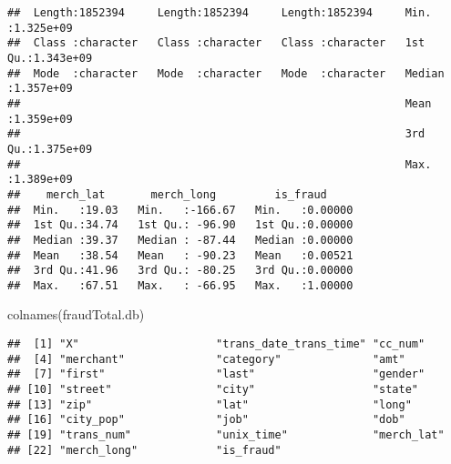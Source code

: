 \documentclass[
]{article}
\newenvironment{Shaded}{\begin{snugshade}}{\end{snugshade}}
\newcommand{\FunctionTok}[1]{\textcolor[rgb]{0.00,0.00,0.00}{#1}}
\newcommand{\NormalTok}[1]{#1}
\begin{document}
\begin{verbatim}
##  Length:1852394     Length:1852394     Length:1852394     Min.   :1.325e+09  
##  Class :character   Class :character   Class :character   1st Qu.:1.343e+09  
##  Mode  :character   Mode  :character   Mode  :character   Median :1.357e+09  
##                                                           Mean   :1.359e+09  
##                                                           3rd Qu.:1.375e+09  
##                                                           Max.   :1.389e+09  
##    merch_lat       merch_long         is_fraud      
##  Min.   :19.03   Min.   :-166.67   Min.   :0.00000  
##  1st Qu.:34.74   1st Qu.: -96.90   1st Qu.:0.00000  
##  Median :39.37   Median : -87.44   Median :0.00000  
##  Mean   :38.54   Mean   : -90.23   Mean   :0.00521  
##  3rd Qu.:41.96   3rd Qu.: -80.25   3rd Qu.:0.00000  
##  Max.   :67.51   Max.   : -66.95   Max.   :1.00000
\end{verbatim}

\begin{Shaded}
\begin{Highlighting}[]
\FunctionTok{colnames}\NormalTok{(fraudTotal.db)}
\end{Highlighting}
\end{Shaded}

\begin{verbatim}
##  [1] "X"                     "trans_date_trans_time" "cc_num"               
##  [4] "merchant"              "category"              "amt"                  
##  [7] "first"                 "last"                  "gender"               
## [10] "street"                "city"                  "state"                
## [13] "zip"                   "lat"                   "long"                 
## [16] "city_pop"              "job"                   "dob"                  
## [19] "trans_num"             "unix_time"             "merch_lat"            
## [22] "merch_long"            "is_fraud"
\end{verbatim}
\end{document}
